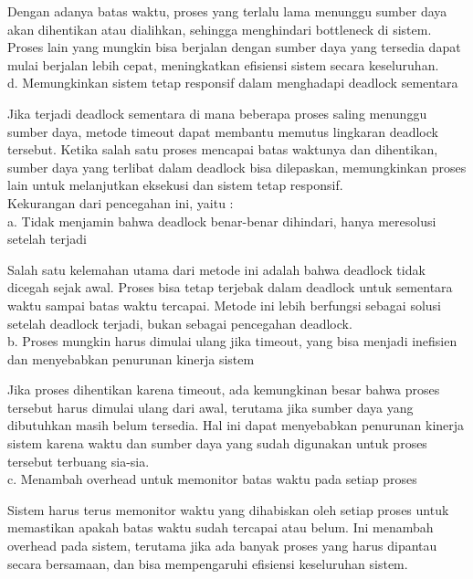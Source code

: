 \documentclass[12pt]{article}
\begin{document}
    Dengan adanya batas waktu, proses yang terlalu lama menunggu sumber daya akan dihentikan atau dialihkan, sehingga menghindari bottleneck di sistem. Proses lain yang mungkin bisa berjalan dengan sumber daya yang tersedia dapat mulai berjalan lebih cepat, meningkatkan efisiensi sistem secara keseluruhan.\\

    d. Memungkinkan sistem tetap responsif dalam menghadapi deadlock sementara
    
    Jika terjadi deadlock sementara di mana beberapa proses saling menunggu sumber daya, metode timeout dapat membantu memutus lingkaran deadlock tersebut. Ketika salah satu proses mencapai batas waktunya dan dihentikan, sumber daya yang terlibat dalam deadlock bisa dilepaskan, memungkinkan proses lain untuk melanjutkan eksekusi dan sistem tetap responsif.\\

    Kekurangan dari pencegahan ini, yaitu :\\

    a. Tidak menjamin bahwa deadlock benar-benar dihindari, hanya meresolusi setelah terjadi
    
    Salah satu kelemahan utama dari metode ini adalah bahwa deadlock tidak dicegah sejak awal. Proses bisa tetap terjebak dalam deadlock untuk sementara waktu sampai batas waktu tercapai. Metode ini lebih berfungsi sebagai solusi setelah deadlock terjadi, bukan sebagai pencegahan deadlock.\\

    b. Proses mungkin harus dimulai ulang jika timeout, yang bisa menjadi inefisien dan menyebabkan penurunan kinerja sistem
    
    Jika proses dihentikan karena timeout, ada kemungkinan besar bahwa proses tersebut harus dimulai ulang dari awal, terutama jika sumber daya yang dibutuhkan masih belum tersedia. Hal ini dapat menyebabkan penurunan kinerja sistem karena waktu dan sumber daya yang sudah digunakan untuk proses tersebut terbuang sia-sia.\\

    c. Menambah overhead untuk memonitor batas waktu pada setiap proses
    
    Sistem harus terus memonitor waktu yang dihabiskan oleh setiap proses untuk memastikan apakah batas waktu sudah tercapai atau belum. Ini menambah overhead pada sistem, terutama jika ada banyak proses yang harus dipantau secara bersamaan, dan bisa mempengaruhi efisiensi keseluruhan sistem.\\
\end{document}
